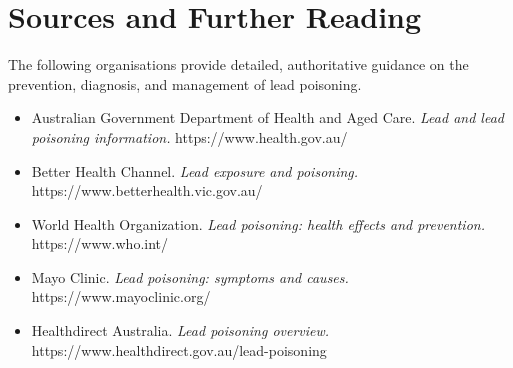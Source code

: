 \section*{Sources and Further Reading}
The following organisations provide detailed, authoritative guidance on the prevention, diagnosis, and management of lead poisoning.
\begin{itemize}
    \item Australian Government Department of Health and Aged Care. \textit{Lead and lead poisoning information.} https://www.health.gov.au/
    \item Better Health Channel. \textit{Lead exposure and poisoning.} https://www.betterhealth.vic.gov.au/
    \item World Health Organization. \textit{Lead poisoning: health effects and prevention.} https://www.who.int/
    \item Mayo Clinic. \textit{Lead poisoning: symptoms and causes.} https://www.mayoclinic.org/
    \item Healthdirect Australia. \textit{Lead poisoning overview.} https://www.healthdirect.gov.au/lead-poisoning
\end{itemize}
